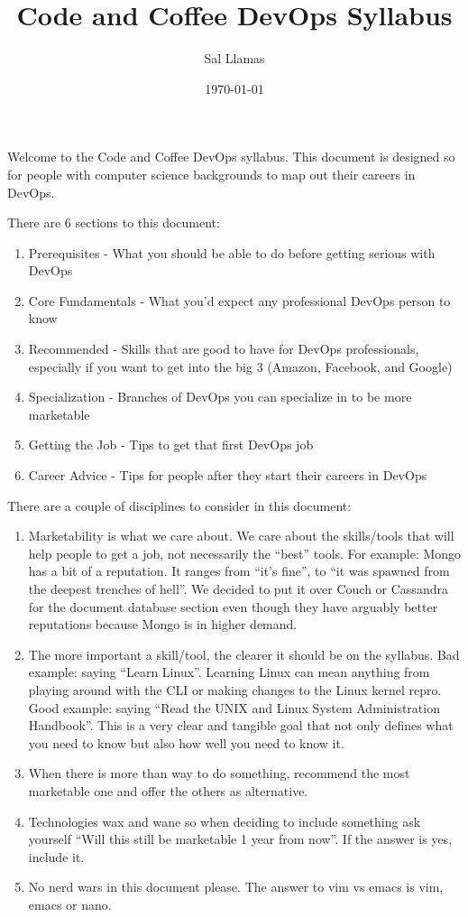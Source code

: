 \documentclass[12pt]{article}
\title{Code and Coffee DevOps Syllabus}
\author{Sal Llamas}
\date{\today}
\begin{document}
\maketitle

Welcome to the Code and Coffee DevOps syllabus. This document is
designed so for people with computer science backgrounds to map out
their careers in DevOps.

There are 6 sections to this document:
\begin{enumerate}
\item Prerequisites - What you should be able to do before getting
  serious with DevOps
\item Core Fundamentals - What you’d expect any professional DevOps
  person to know
\item Recommended - Skills that are good to have for DevOps
  professionals, especially if you want to get into the big 3 (Amazon,
  Facebook, and Google)
\item Specialization - Branches of DevOps you can specialize in to be
  more marketable
\item Getting the Job - Tips to get that first DevOps job
\item Career Advice - Tips for people after they start their careers
  in DevOps
\end{enumerate}

There are a couple of disciplines to consider in this document:
\begin{enumerate}
\item Marketability is what we care about. We care about the
  skills/tools that will help people to get a job, not necessarily the
  “best” tools. For example: Mongo has a bit of a reputation. It
  ranges from “it’s fine”, to “it was spawned from the deepest
  trenches of hell”. We decided to put it over Couch or Cassandra for
  the document database section even though they have arguably better
  reputations because Mongo is in higher demand.
\item The more important a skill/tool, the clearer it should be on the
  syllabus. Bad example: saying “Learn Linux”. Learning Linux can mean
  anything from playing around with the CLI or making changes to the
  Linux kernel repro. Good example: saying “Read the UNIX and Linux
  System Administration Handbook”. This is a very clear and tangible
  goal that not only defines what you need to know but also how well
  you need to know it.
\item When there is more than way to do something, recommend the most
  marketable one and offer the others as alternative.
\item Technologies wax and wane so when deciding to include something
  ask yourself “Will this still be marketable 1 year from now”. If the
  answer is yes, include it.
\item No nerd wars in this document please. The answer to vim vs emacs
  is vim, emacs or nano.
\end{enumerate}
\end{document}
